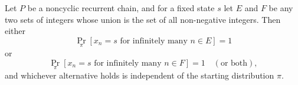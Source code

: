 Let $P$ be a noncyclic recurrent chain, and for a fixed state $s$ let $E$ and $F$ be any two sets of integers whose union is the set of all non-negative integers. Then either
$$\Pr_{\pi}[x_n = s \text{ for infinitely many } n \in E] = 1$$
or
$$\Pr_{\pi}[x_n = s \text{ for infinitely many } n \in F] = 1 \quad (\text{or both}),$$
and whichever alternative holds is independent of the starting distribution $\pi$.
